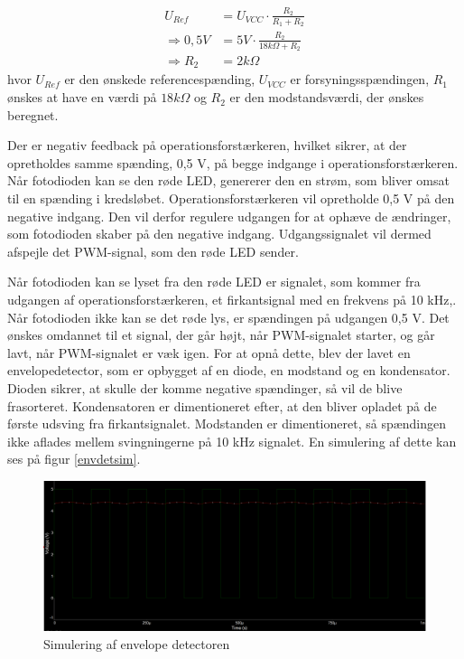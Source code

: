 \begin{align}
	U_{Ref}&=U_{VCC} \cdot \frac{R_{2}}{R_{1}+R_{2}} \\ 	\nonumber
	\Rightarrow 0,5V &= 5V \cdot \frac{R_{2}}{18k\Omega + R_{2}} \\	
	\Rightarrow R_{2}&=2k\Omega		\nonumber
\end{align}
\noindent hvor $U_{Ref}$ er den ønskede referencespænding, $U_{VCC}$ er forsyningsspændingen, $R_{1}$ ønskes at have en værdi på $18k\Omega$ og $R_{2}$ er den modstandsværdi, der ønskes beregnet. 

Der er negativ feedback på operationsforstærkeren, hvilket sikrer, at der opretholdes samme spænding, 0,5 V, på begge indgange i operationsforstærkeren. Når fotodioden kan se den røde LED, genererer den en strøm, som bliver omsat til en spænding i kredsløbet. Operationsforstærkeren vil opretholde 0,5 V på den negative indgang. Den vil derfor regulere udgangen for at ophæve de ændringer, som fotodioden skaber på den negative indgang. Udgangssignalet vil dermed afspejle det PWM-signal, som den røde LED sender.  

Når fotodioden kan se lyset fra den røde LED er signalet, som kommer fra udgangen af operationsforstærkeren, et firkantsignal med en frekvens på 10 kHz,. Når fotodioden ikke kan se det røde lys, er spændingen på udgangen 0,5 V. Det ønskes omdannet til et signal, der går højt, når PWM-signalet starter, og går lavt, når PWM-signalet er væk igen. For at opnå dette, blev der lavet en envelopedetector, som er opbygget af en diode, en modstand og en kondensator. Dioden sikrer, at skulle der komme negative spændinger, så vil de blive frasorteret. Kondensatoren er dimentioneret efter, at den bliver opladet på de første udsving fra firkantsignalet. Modstanden er dimentioneret, så spændingen ikke aflades mellem svingningerne på 10 kHz signalet. En simulering af dette kan ses på figur \ref{envdetsim}. 

\begin{figure}[H]
	\centering
	\includegraphics[width=\textwidth]{Afsnit/DesignOgImplementering/images/envelope_detector}
	\caption{Simulering af envelope detectoren}
	\label{fig:envdetsim}
\end{figure}

